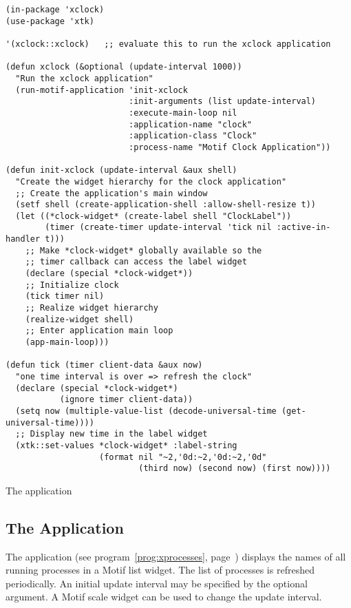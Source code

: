\begin{proglist}[htbp]
\fnsize\begin{verbatim}
(in-package 'xclock)
(use-package 'xtk)

'(xclock::xclock)   ;; evaluate this to run the xclock application

(defun xclock (&optional (update-interval 1000))
  "Run the xclock application"
  (run-motif-application 'init-xclock
                         :init-arguments (list update-interval)
                         :execute-main-loop nil
                         :application-name "clock"
                         :application-class "Clock"
                         :process-name "Motif Clock Application"))

(defun init-xclock (update-interval &aux shell)
  "Create the widget hierarchy for the clock application"
  ;; Create the application's main window
  (setf shell (create-application-shell :allow-shell-resize t))
  (let ((*clock-widget* (create-label shell "ClockLabel"))
        (timer (create-timer update-interval 'tick nil :active-in-handler t)))
    ;; Make *clock-widget* globally available so the
    ;; timer callback can access the label widget
    (declare (special *clock-widget*))
    ;; Initialize clock
    (tick timer nil)
    ;; Realize widget hierarchy
    (realize-widget shell)
    ;; Enter application main loop
    (app-main-loop)))

(defun tick (timer client-data &aux now)
  "one time interval is over => refresh the clock"
  (declare (special *clock-widget*)
           (ignore timer client-data))
  (setq now (multiple-value-list (decode-universal-time (get-universal-time))))
  ;; Display new time in the label widget
  (xtk::set-values *clock-widget* :label-string
                   (format nil "~2,'0d:~2,'0d:~2,'0d"
                           (third now) (second now) (first now))))
\end{verbatim}\normalsize
\caption{\label{prog:xclock}The application }
\end{proglist}

\subsection{The Application }\label{ex:xprocesses}

The  application (see program~\ref{prog:xprocesses},
page~\pageref{prog:xprocesses}) displays the names of all running processes in a
Motif list widget.  The list of processes is refreshed periodically.  An initial
update interval may be specified by the optional 
argument. A Motif scale widget can be used to change the update interval.

